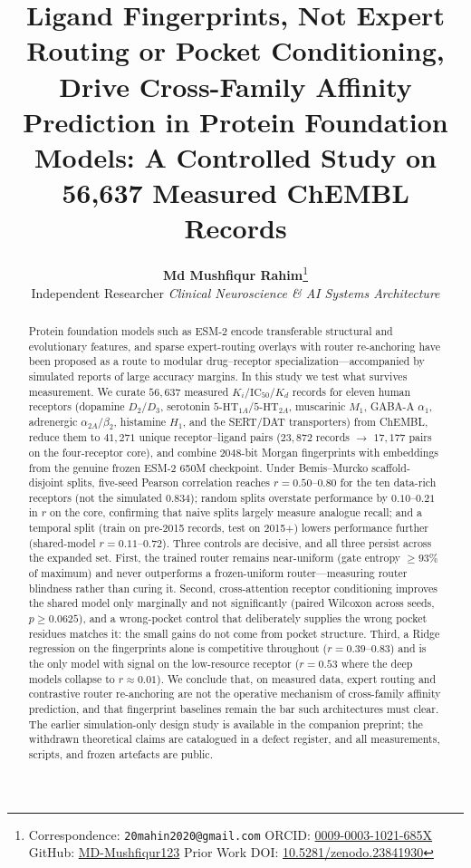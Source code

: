 \documentclass{article}
\title{\textbf{Ligand Fingerprints, Not Expert Routing or Pocket Conditioning, Drive Cross-Family Affinity Prediction in Protein Foundation Models: A Controlled Study on 56,637 Measured ChEMBL Records}}
\author{
  \textbf{Md Mushfiqur Rahim}\thanks{Correspondence: \texttt{20mahin2020@gmail.com} \quad ORCID: \href{https://orcid.org/0009-0003-1021-685X}{0009-0003-1021-685X} \quad GitHub: \href{https://github.com/MD-Mushfiqur123}{MD-Mushfiqur123} \quad Prior Work DOI: \href{https://doi.org/10.5281/zenodo.23841930}{10.5281/zenodo.23841930}} \\
  Independent Researcher \quad \textit{Clinical Neuroscience \& AI Systems Architecture}
}
\theoremstyle{definition}
\begin{document}
\maketitle

\begin{abstract}
Protein foundation models such as ESM-2 encode transferable structural and evolutionary features, and sparse expert-routing overlays with router re-anchoring have been proposed as a route to modular drug--receptor specialization---accompanied by simulated reports of large accuracy margins. In this study we test what survives measurement. We curate $56{,}637$ measured $K_i/\mathrm{IC}_{50}/K_d$ records for eleven human receptors (dopamine $D_2$/$D_3$, serotonin $5\text{-HT}_{1A}$/$5\text{-HT}_{2A}$, muscarinic $M_1$, GABA-A $\alpha_1$, adrenergic $\alpha_{2A}$/$\beta_2$, histamine $H_1$, and the SERT/DAT transporters) from ChEMBL, reduce them to $41{,}271$ unique receptor--ligand pairs ($23{,}872$ records $\to$ $17{,}177$ pairs on the four-receptor core), and combine $2048$-bit Morgan fingerprints with embeddings from the genuine frozen ESM-2 650M checkpoint. Under Bemis--Murcko scaffold-disjoint splits, five-seed Pearson correlation reaches $r = 0.50$--$0.80$ for the ten data-rich receptors (not the simulated $0.834$); random splits overstate performance by $0.10$--$0.21$ in $r$ on the core, confirming that naive splits largely measure analogue recall; and a temporal split (train on pre-2015 records, test on 2015+) lowers performance further (shared-model $r = 0.11$--$0.72$). Three controls are decisive, and all three persist across the expanded set. First, the trained router remains near-uniform (gate entropy $\ge 93\%$ of maximum) and never outperforms a frozen-uniform router---measuring router blindness rather than curing it. Second, cross-attention receptor conditioning improves the shared model only marginally and not significantly (paired Wilcoxon across seeds, $p \ge 0.0625$), and a wrong-pocket control that deliberately supplies the wrong pocket residues matches it: the small gains do not come from pocket structure. Third, a Ridge regression on the fingerprints alone is competitive throughout ($r = 0.39$--$0.83$) and is the only model with signal on the low-resource receptor ($r = 0.53$ where the deep models collapse to $r \approx 0.01$). We conclude that, on measured data, expert routing and contrastive router re-anchoring are not the operative mechanism of cross-family affinity prediction, and that fingerprint baselines remain the bar such architectures must clear. The earlier simulation-only design study is available in the companion preprint; the withdrawn theoretical claims are catalogued in a defect register, and all measurements, scripts, and frozen artefacts are public.
\end{abstract}
\end{document}
